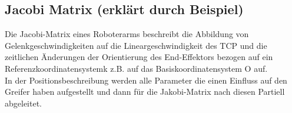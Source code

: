 
 
 
		
		
		

	\subsection{Jacobi Matrix \small{ (erklärt durch Beispiel)}}
		
		
        Die Jacobi-Matrix eines Roboterarms beschreibt die Abbildung von
        Gelenkgeschwindigkeiten auf die Lineargeschwindigkeit des TCP
        und die zeitlichen Änderungen der Orientierung des End-Effektors
        bezogen auf ein Referenzkoordinatensystemk z.B. auf das
        Basiskoordinatensystem O auf. \\
        In der Positionsbeschreibung werden alle Parameter die einen Einfluss 
       auf den Greifer haben aufgestellt und dann für die Jakobi-Matrix nach diesen Partiell abgeleitet. \\
    
